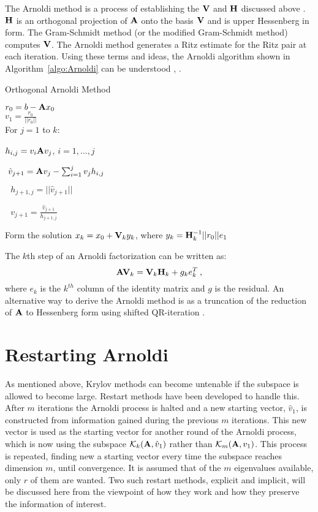 The Arnoldi method is a process of establishing the $\mathbf{V}$ and $\mathbf{H}$ discussed above \cite{Stewart2001}. $\mathbf{H}$ is an orthogonal projection of $\mathbf{A}$ onto the basis $\mathbf{V}$ and is upper Hessenberg in form. The Gram-Schmidt method (or the modified Gram-Schmidt method) computes $\mathbf{V}$. The Arnoldi method generates a Ritz estimate for the Ritz pair at each iteration. Using these terms and ideas, the Arnoldi algorithm shown in Algorithm~\ref{algo:Arnoldi} can be understood \cite{Saad1986}, \cite{Sorensen1996}.
%
\begin{algorithm}
  \caption{ Orthogonal Arnoldi Method}
  $r_0 = b - \mathbf{A}x_0$ \\
  $v_1 = \frac{r_0}{||r_0||}$ \\
  For $j = 1$ to $k$: 
  \begin{list}{}{\hspace{2em}}
    \item $h_{i,j} = v_i \mathbf{A} v_j$, $i = 1, \dots, j$ 
    \item $\text{ } \hat{v}_{j+1} = \mathbf{A}v_j - \sum_{i=1}^{j} v_j h_{i,j}$ 
    \item $\text{ } h_{j+1,j} = ||\hat{v}_{j+1}||$ 
    \item $\text{ } v_{j+1} = \frac{\hat{v}_{j+1}} {h_{j+1,j}}$ 
  \end{list}
  Form the solution $x_k = x_0 + \mathbf{V}_k y_k$, where $y_k = \mathbf{H}_k^{-1} ||r_0|| e_1$
  \label{algo:Arnoldi}
\end{algorithm}

The $k$th step of an Arnoldi factorization can be written as: 
%
\begin{equation}
  \mathbf{AV}_{k} = \mathbf{V}_{k}\mathbf{H}_{k} + g_{k}e_{k}^{T} \:,
\end{equation} 
%
where $e_{k}$ is the $k^{th}$ column of the identity matrix and $g$ is the residual. An alternative way to derive the Arnoldi method is as a truncation of the reduction of $\mathbf{A}$ to Hessenberg form using shifted QR-iteration \cite{Sorensen1996}.

\section{Restarting Arnoldi}
As mentioned above, Krylov methods can become untenable if the subspace is allowed to become large. Restart methods have been developed to handle this. After $m$ iterations the Arnoldi process is halted and a new starting vector, $\hat{v}_1$, is constructed from information gained during the previous $m$ iterations. This new vector is used as the starting vector for another round of the Arnoldi process, which is now using the subspace $\mathcal{K}_k(\mathbf{A},\hat{v}_1)$ rather than $\mathcal{K}_m(\mathbf{A},v_1)$. This process is repeated, finding new a starting vector every time the subspace reaches dimension $m$, until convergence. It is assumed that of the $m$ eigenvalues available, only $r$ of them are wanted. Two such restart methods, explicit and implicit, will be discussed here from the viewpoint of how they work and how they preserve the information of interest. 

